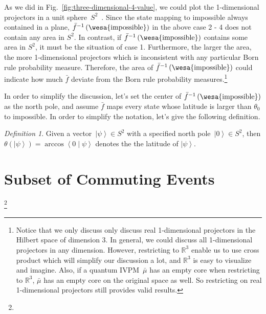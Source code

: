 \documentclass{article}
\theoremstyle{remark}
\newtheorem{definition}{Definition}
\newcommand{\imposs}{{\mbox{\wesa{impossible}}}}
\newcommand{\ket}[1]{{\left\vert{#1}\right\rangle}}
\newcommand{\ip}[2]{\ensuremath{\left\langle{#1}\middle\vert{#2}\right\rangle}}
\newcommand{\yutsung}[1]{\fbox{\begin{minipage}{0.9\textwidth}\color{purple}{Yu-Tsung says: #1}\end{minipage}}}
\begin{document}
As we did in Fig.~\ref{fig:three-dimensional-4-value}, we could
plot the 1-dimensional projectors in a unit sphere~$S^{2}$~\cite{Hatcher2001,dryden2005}.
Since the state mapping to impossible always contained in a plane,
$\bar{f}^{-1}\left(\imposs\right)$ in the above case 2 - 4 does not
contain any area in $S^{2}$. In contrast, if $\bar{f}^{-1}\left(\imposs\right)$
contains some area in $S^{2}$, it must be the situation of case 1.
Furthermore, the larger the area, the more 1-dimensional projectors
which is inconsistent with any particular Born rule probability measure.
Therefore, the area of $\bar{f}^{-1}\left(\imposs\right)$ could indicate
how much $\bar{f}$ deviate from the Born rule probability measures.\footnote{Notice that we only discuss only discuss real 1-dimensional projectors
in the Hilbert space of dimension 3. In general, we could discuss
all 1-dimensional projectors in any dimension. However, restricting
to $\mathbb{R}^{3}$ enable us to use cross product which will simplify
our discussion a lot, and $\mathbb{R}^{3}$ is easy to visualize and
imagine. Also, if a quantum IVPM~$\bar{\mu}$ has an empty core when
restricting to $\mathbb{R}^{3}$, $\bar{\mu}$ has an empty core on
the original space as well. So restricting on real 1-dimensional projectors
still provides valid results.}

In order to simplify the discussion, let's set the center of $\bar{f}^{-1}\left(\imposs\right)$
as the north pole, and assume $\bar{f}$ maps every state whose latitude
is larger than $\theta_{0}$ to impossible. In order to simplify the
notation, let's give the following definition.

\begin{definition}Given a vector~$\ket{\psi}\in S^{2}$ with a specified
north pole~$\ket{0}\in S^{2}$, then $\theta\left(\ket{\psi}\right)=\arccos\ip{0}{\psi}$
denotes the the latitude of $\ket{\psi}$.\end{definition}

\section{Subset of Commuting Events}

\footnote{\yutsung{The Kochen-Specker theorem is about assigning definitely
value to observables such that the values of commuting observables
are consistent; the Bell theorem is about entangled states in different
locations. If our results are more related to commuting observables,
it is more related to the Kochen-Specker theorem than the Bell theorem...}}
\end{document}
